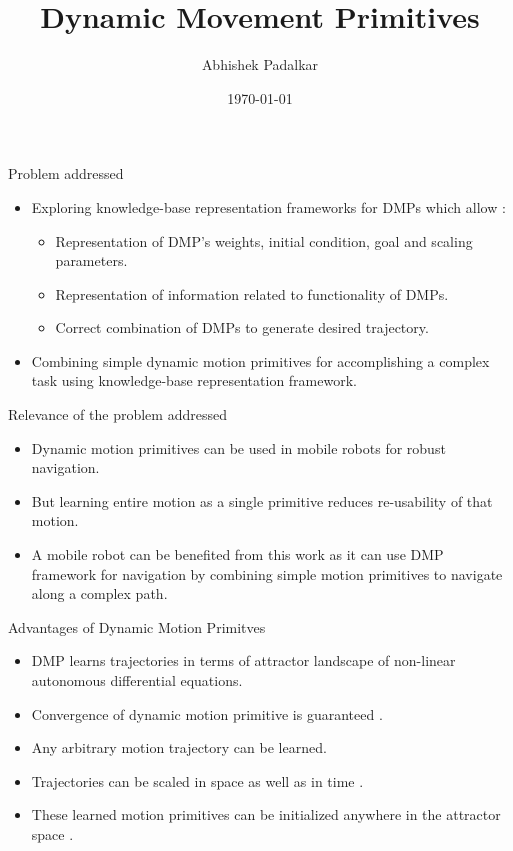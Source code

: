 \documentclass{beamer}
\title[DMP]{Dynamic Movement Primitives} %
\author{Abhishek Padalkar} %
\institute[HBRS] %
{
Hochschule Bonn-Rhein-Sieg \\ %
\medskip
\textit{abhishek.padalkar@smail.inf.h-brs.com} %
}
\date{\today} %
\begin{document}
\begin{frame}
\titlepage %
\nocite{*}
\end{frame}

\begin{frame}{Problem addressed}
\begin{itemize}

\item Exploring knowledge-base representation frameworks for DMPs which allow :
\begin{itemize}
\item Representation of DMP's weights, initial condition, goal and scaling parameters. 
\item Representation of information related to functionality of DMPs. 
\item Correct combination of DMPs to generate desired trajectory.
\end{itemize} 
\item Combining simple dynamic motion primitives for accomplishing a complex task using knowledge-base representation framework. 
\end{itemize}
\end{frame}

\begin{frame}{Relevance of the problem addressed}
\begin{itemize}
\item Dynamic motion primitives can be used in mobile robots for robust navigation. 
\item But learning entire motion as a single primitive reduces re-usability of that motion.  
\item A mobile robot can be benefited from this work as it can use DMP framework for navigation by combining simple motion primitives to navigate along a complex path.
\end{itemize}
\end{frame}

\begin{frame}{Advantages of Dynamic Motion Primitves}
\begin{itemize}

\item DMP learns trajectories in terms of attractor landscape of non-linear autonomous differential equations.
\item Convergence of dynamic motion primitive is guaranteed \cite{schaal2006dynamic}.  
\item Any arbitrary motion trajectory can be learned. 
\item Trajectories can be scaled in space as well as in time \cite{schaal2006dynamic,ijspeert2013dynamical}. 
\item These learned motion primitives can be initialized anywhere in the attractor space \cite{schaal2006dynamic,ijspeert2013dynamical}.

\end{itemize}
\end{frame}
\end{document}

